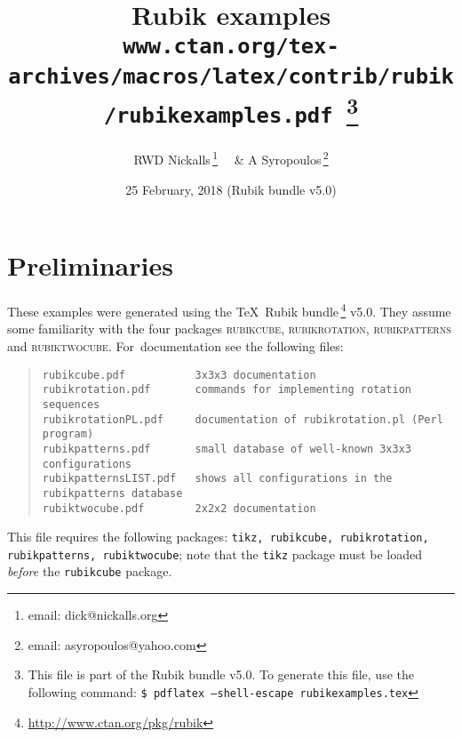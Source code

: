 \documentclass[a4paper]{article}
\begin{document}
%
\ifpdf{}\fi
\title{Rubik examples\\ 
\smallskip\normalsize\texttt{www.ctan.org/tex-archives/macros/latex/contrib/rubik/rubikexamples.pdf}
\,\footnote{This file is part of the Rubik bundle v5.0. To generate this file, 
use the following command: \newline \texttt{\$ pdflatex --shell-escape  rubikexamples.tex}}}
\author{RWD Nickalls\,\footnote{email: \textsf{dick@nickalls.org}}%
  \ \ \& A Syropoulos\,\footnote{email: \textsf{asyropoulos@yahoo.com}}}
\date{25 February, 2018 (Rubik bundle v5.0)}
\maketitle
\tableofcontents

\pagebreak
\section{Preliminaries}
These  examples  were generated using  the \TeX\ 
Rubik bundle\,\footnote{\url{http://www.ctan.org/pkg/rubik}} v5.0. 
They assume some familiarity with the four  packages \textsc{rubikcube}, 
\textsc{rubikrotation}, \textsc{rubikpatterns} and \textsc{rubiktwocube}. 
For~documentation see the following  files:

\begin{quote}
\begin{verbatim}
rubikcube.pdf           3x3x3 documentation
rubikrotation.pdf       commands for implementing rotation sequences
rubikrotationPL.pdf     documentation of rubikrotation.pl (Perl program)
rubikpatterns.pdf       small database of well-known 3x3x3 configurations
rubikpatternsLIST.pdf   shows all configurations in the rubikpatterns database
rubiktwocube.pdf        2x2x2 documentation
\end{verbatim}
\end{quote}

This file requires the following packages: \texttt{tikz, rubikcube, rubikrotation,
rubikpatterns, rubiktwocube}; note that the \texttt{tikz} package must be loaded 
\textit{before} the \texttt{rubikcube} package.
\end{document}
